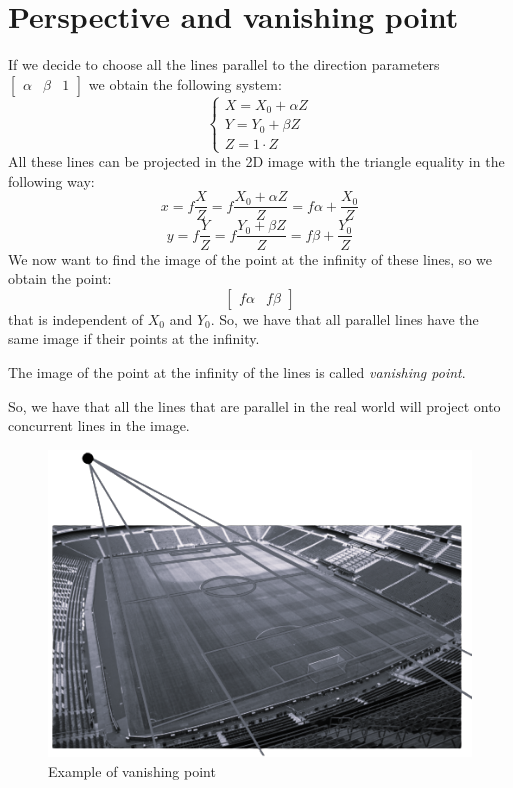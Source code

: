 \documentclass[12pt, a4paper]{report}
\newtheorem[style=M,bodystyle=\normalfont]{theorem}{Theorem}
\newtheorem[style=M,bodystyle=\normalfont]{corollary}{Corollary}
\newtheorem[style=M,bodystyle=\normalfont]{lemma}{Lemma}
\newtheorem[style=M,bodystyle=\normalfont]{definition}{Definition}
\begin{document}
    \section{Perspective and vanishing point}
    If we decide to choose all the lines parallel to the direction parameters $\begin{bmatrix} \alpha & \beta & 1 \end{bmatrix}$ we obtain the following system: 
    \[
        \begin{cases}
            X = X_0 + \alpha Z  \\
            Y = Y_0 + \beta Z   \\
            Z = 1 \cdot Z
        \end{cases}
    \]
    All these lines can be projected in the 2D image with the triangle equality in the following way: 
    \[x=f \dfrac{X}{Z} = f \dfrac{X_0 + \alpha Z}{Z} = f\alpha + \dfrac{X_0}{Z}\]
    \[y=f \dfrac{Y}{Z} = f \dfrac{Y_0 + \beta Z}{Z}  = f\beta  + \dfrac{Y_0}{Z}\]
    We now want to find the image of the point at the infinity of these lines, so we obtain the point: 
    \[\begin{bmatrix} f\alpha & f\beta \end{bmatrix}\]
    that is independent of $X_0$ and $Y_0$. So, we have that all parallel lines have the same image if their points at the infinity.
    \begin{definition}
        The image of the point at the infinity of the lines is called \emph{vanishing point}. 
    \end{definition}
    So, we have that all the lines that are parallel in the real world will project onto concurrent lines in the image. 
    \begin{figure}[H]
        \centering
        \includegraphics[width=0.6\linewidth]{images/vanishingpoint.png}
        \caption{Example of vanishing point}
    \end{figure}
\end{document}
